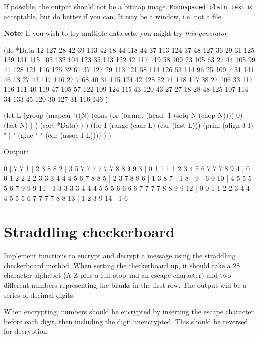 \begin{itemize}
If possible, the output should not be a bitmap image.
\texttt{Monospaced plain text} is acceptable, but do better if you can.
It may be a window, i.e. not a file.

\textbf{Note:} If you wish to try multiple data sets, you might try
\emph{this generator}.


\begin{wideverbatim}

(de *Data
   12 127 28 42 39 113 42 18 44 118 44 37 113 124 37 48 127 36
   29 31 125 139 131 115 105 132 104 123 35 113 122 42 117 119
   58 109 23 105 63 27 44 105 99 41 128 121 116 125 32 61 37 127
   29 113 121 58 114 126 53 114 96 25 109 7 31 141 46 13 27 43
   117 116 27 7 68 40 31 115 124 42 128 52 71 118 117 38 27 106
   33 117 116 111 40 119 47 105 57 122 109 124 115 43 120 43 27
   27 18 28 48 125 107 114 34 133 45 120 30 127 31 116 146 )

(let L
   (group
      (mapcar
         '((N)
            (cons
               (or (format (head -1 (setq N (chop N)))) 0)
               (last N) ) )
         (sort *Data) ) )
   (for I (range (caar L) (car (last L)))
      (prinl (align 3 I) " | " (glue " " (cdr (assoc I L)))) ) )

Output:

  0 | 7 7
  1 | 2 3 8 8
  2 | 3 5 7 7 7 7 7 7 8 8 9 9
  3 | 0 1 1 1 1 2 3 4 5 6 7 7 7 8 9
  4 | 0 0 1 2 2 2 2 3 3 3 4 4 4 5 6 7 8 8
  5 | 2 3 7 8 8
  6 | 1 3 8
  7 | 1
  8 |
  9 | 6 9
 10 | 4 5 5 5 5 6 7 9 9 9
 11 | 1 3 3 3 3 4 4 4 5 5 5 6 6 6 6 7 7 7 7 8 8 9 9
 12 | 0 0 1 1 2 2 3 4 4 4 5 5 5 6 7 7 7 7 8 8
 13 | 1 2 3 9
 14 | 1 6

\end{wideverbatim}

\pagebreak{}
\section*{Straddling checkerboard}

Implement functions to encrypt and decrypt a message using the
\href{http://en.wikipedia.org/wiki/Straddling\_checkerboard}{straddling
checkerboard} method. When setting the checkerboard up, it should take a
28 character alphabet (A-Z plus a full stop and an escape character) and
two different numbers representing the blanks in the first row. The
output will be a series of decimal digits.

When encrypting, numbers should be encrypted by inserting the escape
character before each digit, then including the digit unencrypted. This
should be reversed for decryption.


\end{itemize}
